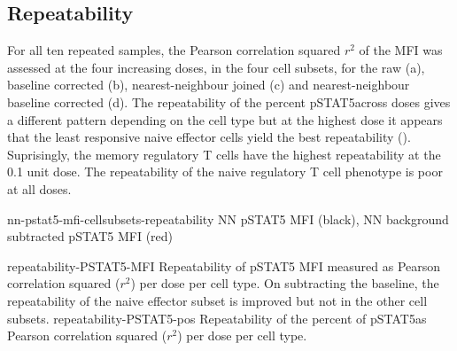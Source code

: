 \subsection{Repeatability}


For all ten repeated samples, the Pearson correlation squared $r^2$ of the MFI was assessed at the four increasing doses, in the four cell subsets,
for the raw (a),
baseline corrected (b),
nearest-neighbour joined (c)
and nearest-neighbour baseline corrected (d).
The repeatability of the percent pSTAT5\positive across doses gives a different pattern depending on the cell type
but at the highest dose it appears that the least responsive naive effector cells yield the best
repeatability ().
Suprisingly, the memory regulatory T cells have the highest repeatability at the 0.1 unit dose.
The repeatability of the naive regulatory T cell phenotype is poor at all doses.

{nn-pstat5-mfi-cellsubsets-repeatability}
{ NN pSTAT5 MFI (black), NN background subtracted pSTAT5 MFI (red) }
{

}
{repeatability-PSTAT5-MFI}
{
  Repeatability of pSTAT5 MFI measured as Pearson correlation squared ($r^2$) per dose per cell type.
}
{
  On subtracting the baseline, the repeatability of the naive effector subset is improved but not in the other cell subsets.
} 
{repeatability-PSTAT5-pos}
{
  Repeatability of the percent of pSTAT5\positive as Pearson correlation squared ($r^2$) per dose per cell type.
}
{
}

%
%

